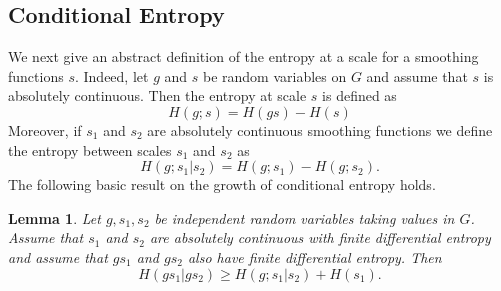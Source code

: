 \documentclass[10pt, english,oneside,reqno]{amsart}
\theoremstyle{plain}
\newtheorem{lemma}[theorem]{Lemma}
\theoremstyle{remark}
\numberwithin{equation}{section}
\numberwithin{figure}{section}
\newcommand{\R}{\mathbb{R}}
\begin{document}






\subsection{Conditional Entropy}  \label{FirstEntropy:Conditional}


We next give an abstract definition of the entropy at a scale for a smoothing functions $s$. Indeed, let $g$ and $s$ be random variables on $G$ and assume that $s$ is absolutely continuous. Then the entropy at scale $s$ is defined as $$H(g; s) = H(gs) - H(s)$$ Moreover, if $s_1$ and $s_2$ are absolutely continuous smoothing functions we define the entropy between scales $s_1$ and $s_2$ as $$H(g; s_1|s_2) = H(g; s_1) - H(g; s_2).$$ The following basic result on the growth of conditional entropy holds.

\begin{lemma}\label{BasicEntropyGrowth}
    Let $g, s_1, s_2$ be independent random variables taking values in $G$. Assume that $s_1$ and $s_2$ are absolutely continuous with finite differential entropy and assume that $gs_1$ and $gs_2$ also have finite differential entropy. Then $$H(gs_1|gs_2) \geq H(g; s_1|s_2) + H(s_1).$$
\end{lemma}
\end{document}
